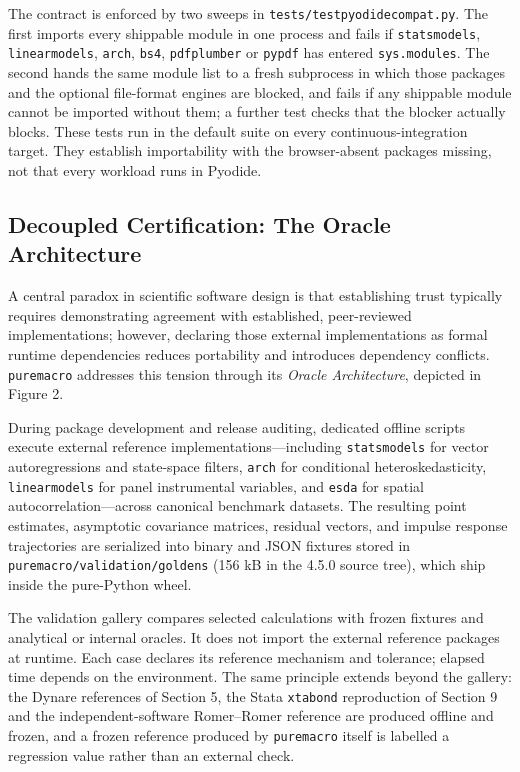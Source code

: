 \documentclass[11pt,letterpaper]{article}
\renewcommand{\_}{\pmunderscore\allowbreak}
\begin{document}
The contract is enforced by two sweeps in \texttt{tests/test\_pyodide\_compat.py}. The first imports every shippable module in one process and fails if \texttt{statsmodels}, \texttt{linearmodels}, \texttt{arch}, \texttt{bs4}, \texttt{pdfplumber} or \texttt{pypdf} has entered \texttt{sys.modules}. The second hands the same module list to a fresh subprocess in which those packages and the optional file-format engines are blocked, and fails if any shippable module cannot be imported without them; a further test checks that the blocker actually blocks. These tests run in the default suite on every continuous-integration target. They establish importability with the browser-absent packages missing, not that every workload runs in Pyodide.

\subsection{Decoupled Certification: The Oracle Architecture}\label{decoupled-certification-the-oracle-architecture}

A central paradox in scientific software design is that establishing trust typically requires demonstrating agreement with established, peer-reviewed implementations; however, declaring those external implementations as formal runtime dependencies reduces portability and introduces dependency conflicts. \texttt{puremacro} addresses this tension through its \emph{Oracle Architecture}, depicted in Figure 2.

During package development and release auditing, dedicated offline scripts execute external reference implementations---including \texttt{statsmodels} for vector autoregressions and state-space filters, \texttt{arch} for conditional heteroskedasticity, \texttt{linearmodels} for panel instrumental variables, and \texttt{esda} for spatial autocorrelation---across canonical benchmark datasets. The resulting point estimates, asymptotic covariance matrices, residual vectors, and impulse response trajectories are serialized into binary and JSON fixtures stored in \texttt{puremacro/validation/goldens} (156 kB in the 4.5.0 source tree), which ship inside the pure-Python wheel.

The validation gallery compares selected calculations with frozen fixtures and analytical or internal oracles. It does not import the external reference packages at runtime. Each case declares its reference mechanism and tolerance; elapsed time depends on the environment. The same principle extends beyond the gallery: the Dynare references of Section 5, the Stata \texttt{xtabond} reproduction of Section 9 and the independent-software Romer--Romer reference are produced offline and frozen, and a frozen reference produced by \texttt{puremacro} itself is labelled a regression value rather than an external check.
\end{document}
